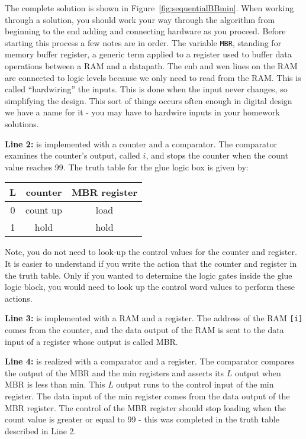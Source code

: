 The complete solution is shown in Figure~\ref{fig:sequentialBBmin}.  When working through
a solution, you should work your way through the algorithm from beginning to the end
adding and connecting hardware as you proceed.  Before starting this process a few notes
are in order. The variable \verb+MBR+, standing for memory buffer register, a generic
term applied to a register used to buffer data operations between a RAM and
a datapath.  The enb and wen lines on the RAM are connected to logic levels because
we only need to read from the RAM.  This is called ``hardwiring'' the inputs.  This is
done when the input never changes, so simplifying the design.  This sort of things
occurs often enough in digital design we have a name for it - you may have to
hardwire inputs in your homework solutions.

\textbf{Line 2:} is implemented with a
counter and a comparator.  The comparator examines the counter's output, called $i$,
and stops the counter when the count value reaches 99.  The truth table for the
glue logic box is given by:

\begin{tabular}{c||c|c}
L & counter & MBR register     \\ \hline \hline
0 & count up & load         \\ \hline
1 & hold     & hold         \\
\end{tabular}

Note, you do not need to look-up the control values for the counter and
register.  It is easier to understand if you write the action that the counter
and register in the truth table. Only if you wanted to determine the logic gates
inside the glue logic block, you would need to look up the control word
values to perform these actions.

\textbf{Line 3:} is implemented with a RAM and a
register.  The address of the RAM \verb+[i]+ comes from the counter, and the
data output of the RAM is sent to the data input of a register whose output is called MBR.

\textbf{Line 4: }
is realized with a comparator and
a register.  The comparator compares the output of the MBR and the min
registers and asserts its $L$ output when MBR is less than min.  This
$L$ output runs to the control input of the min register.  The data
input of the min register comes from the data output of the MBR
register.  The control of the MBR register should stop loading when
the count value is greater or equal to 99 - this was completed in
the truth table described in Line 2.

